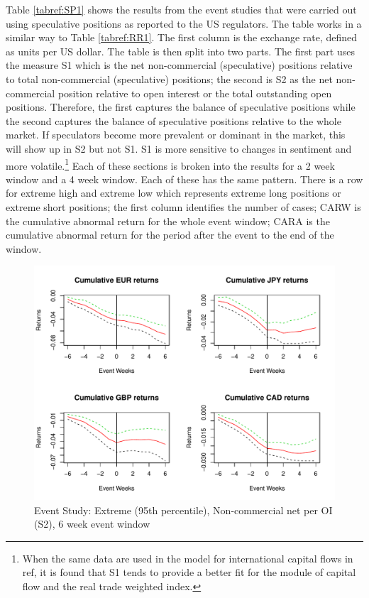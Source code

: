 \documentclass[12pt, a4paper, oneside]{article} %
\begin{document}
Table \ref{tabref:SP1} shows the results from the event studies that were carried out using speculative positions as reported to the US regulators.  The table works in a similar way to Table \ref{tabref:RR1}.  The first column is the exchange rate, defined as units per US dollar.  The table is then split into two parts.  The first part uses the measure S1 which is the net non-commercial (speculative) positions relative to total non-commercial (speculative) positions; the second is S2 as the net non-commercial position relative to open interest or the total outstanding open positions.  Therefore, the first captures the balance of speculative positions while the second captures the balance of speculative positions relative to the whole market.  If speculators become more prevalent or dominant in the market, this will show up in S2 but not S1.  S1 is more sensitive to changes in sentiment and more volatile.\footnote{When the same data are used in the model for international capital flows in ref, it is found that S1 tends to provide a better fit for the module of capital flow and the real trade weighted index.} Each of these sections is broken into the results for a 2 week window and a 4 week window.  Each of these has the same pattern.   There is a row for extreme high and extreme low which represents extreme long positions or extreme short positions; the first  column identifies the number of cases; CARW is the cumulative abnormal return for the whole event window; CARA is the cumulative abnormal return for the period after the event to the end of the window.     

\begin{figure}[h!]
\graphicspath{{../Figures/}}
\centering
\caption{Event Study:  Extreme (95th percentile), Non-commercial net per OI (S2), 6 week event window}
\label{fig:ES3}
\includegraphics[scale=0.8]{FPCum6w}
\end{figure}
\end{document}
